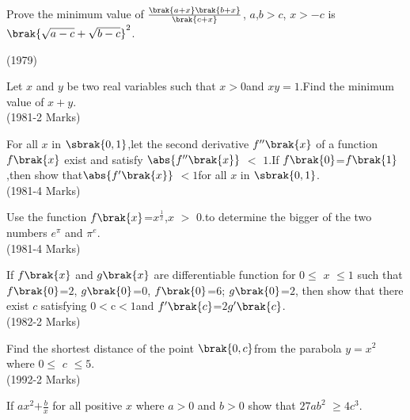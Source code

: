 \iffalse
\title{Applications of Derivatives}
\author{EE24BTECH11060-Sruthi Bijili}
\section{subjective}
\fi
\item  Prove the minimum value of $\frac{\brak{a+x}\brak{b+x}}{\brak{c+x}}$,
$a$,$b$$>$$c$, $x$$>$$-c$ is ${\brak{\sqrt{a-c}+\sqrt{b-c}}}^2$. 
           
\hfill{(1979})


\item  Let $x$ and $y$ be two real variables such that $x$$>$$0$and $xy=1$.Find the minimum value of $x+y$.\\

\hfill{(1981-2 Marks)}

\item  For all $x$ in $\sbrak{0,1}$,let the second derivative $f^{\prime\prime}\brak{x}$ of a function $f\brak{x}$ exist and satisfy $\abs{f^{\prime\prime}\brak{x}}$ $<$ $1$.If $f\brak{0}$=$f\brak{1}$,then show that$\abs{ f^{\prime}\brak{x}}$ $<$$1$for all $x$ in $\sbrak{0,1}$.\\

\hfill{(1981-4 Marks)}

\item  Use the function $f\brak{x}$=$x^\frac{1}{x}$,$x$ $>$ $0$.to determine the bigger of the two numbers $e^\pi$ and $\pi^e$.\\

\hfill{(1981-4 Marks)}

\item  If $f\brak{x}$ and $g\brak{x}$ are differentiable function for $0$$\leq$ $x$ $\leq$$1$ such that $f\brak{0}$=$2$, $g\brak{0}$=$0$, $f\brak{0}$=$6$; $g\brak{0}$=$2$, then show that there exist $c$ satisfying $0$$<$c$<$$1$and $f^{\prime}\brak{c}$=$2$$g^{\prime}\brak{c}$.\\

\hfill{(1982-2 Marks)}

\item  Find the shortest distance of the point $\brak{0,c}$from the parabola $y=x^2$ where $0$$\leq$ $c$ $\leq$$5$.\\

\hfill{(1992-2 Marks)}

\item  If $ax^2$$+$$\frac{b}{x}$  for all positive $x$ where $a$$>$$0$ and $b$$>$$0$ show that $27ab^2$ $\geq$$4c^3$.\\

